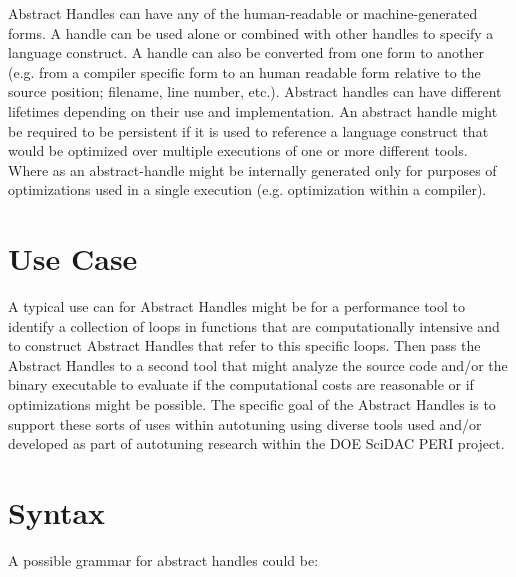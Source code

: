 Abstract Handles can
have any of the human-readable or machine-generated forms. A handle can be used alone or
combined with other handles to specify a language construct. A handle can also be
converted from one form to another (e.g. from a compiler specific form to an human
readable form relative to the source position; filename, line number, etc.).
Abstract handles can have different lifetimes depending on their use and implementation. 
An abstract handle might be required to be persistent if it is used to reference a
language construct that would be optimized over multiple executions of one or more
different tools. Where as an abstract-handle might be internally generated only for
purposes of optimizations used in a single execution (e.g. optimization within a compiler).

\section{Use Case}
   A typical use can for Abstract Handles might be for a performance tool to 
identify a collection of loops in functions that are computationally intensive
and to construct Abstract Handles that refer to this specific loops.  Then
pass the Abstract Handles to a second tool that might analyze the source code
and/or the binary executable to evaluate if the computational costs are reasonable 
or if optimizations might be possible.  The specific goal of the Abstract Handles
is to support these sorts of uses within autotuning using diverse tools used
and/or developed as part of autotuning research within the DOE SciDAC PERI project.

\section{Syntax}
   A possible grammar for abstract handles could be:

